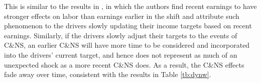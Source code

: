 \documentclass[reviewmode,AEJ]{AEA}
\begin{document}




This is similar to the results in \citet{thakral2018daily}, in which the authors find recent
earnings to have stronger effects on labor than earnings earlier in the shift 
 and attribute such phenomenon to the drivers slowly updating their income targets based on recent earnings.
Similarly, if the drivers slowly adjust their targets to the events of C\&NS, an earlier C\&NS will have
more time to be considered and incorporated into the drivers' current target, and hence does not represent
as much of an unexpected shock as a more recent C\&NS does. As a result, the C\&NS effects fade away over
time, consistent with the results in Table \ref{tb:dynw}.
\end{document}
